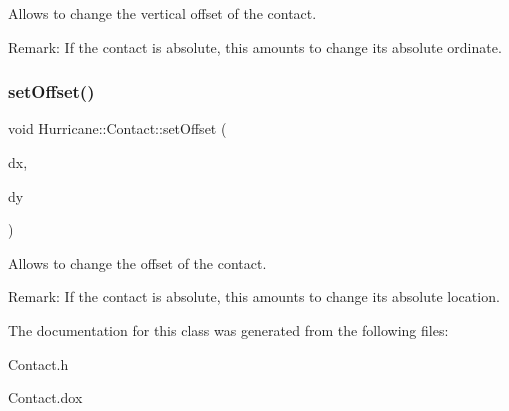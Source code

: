 Allows to change the vertical offset of the contact.

\begin{DoxyParagraph}{Remark\+: If the contact is absolute, this amounts to change its }
absolute ordinate. 
\end{DoxyParagraph}
\mbox{\label{classHurricane_1_1Contact_a41ba972136e77d768f58ad0407d18f8e}} 
\subsubsection{\texorpdfstring{set\+Offset()}{setOffset()}}
{\footnotesize\ttfamily void Hurricane\+::\+Contact\+::set\+Offset (\begin{DoxyParamCaption}\item[{const \mbox{\hyperlink{group__DbUGroup_ga4fbfa3e8c89347af76c9628ea06c4146}{Db\+U\+::\+Unit}} \&}]{dx,  }\item[{const \mbox{\hyperlink{group__DbUGroup_ga4fbfa3e8c89347af76c9628ea06c4146}{Db\+U\+::\+Unit}} \&}]{dy }\end{DoxyParamCaption})}

Allows to change the offset of the contact.

\begin{DoxyParagraph}{Remark\+: If the contact is absolute, this amounts to change its }
absolute location. 
\end{DoxyParagraph}


The documentation for this class was generated from the following files\+:\begin{DoxyCompactItemize}
\item 
Contact.\+h\item 
Contact.\+dox\end{DoxyCompactItemize}
